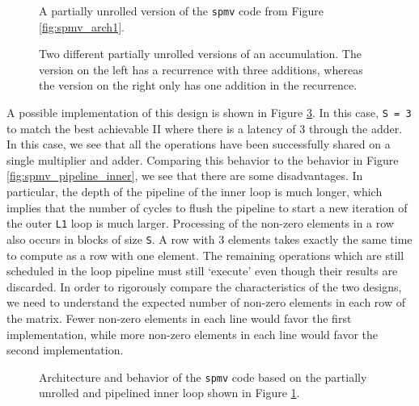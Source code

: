 \begin{figure}

\caption{A partially unrolled version of the \lstinline|spmv| code from Figure \ref{fig:spmv_arch1}.}
\label{fig:spmv_unrolled}
\end{figure}

\begin{figure}
\centering

\caption{Two different partially unrolled versions of an accumulation.  The version on the left has a recurrence with three additions, whereas the version on the right only has one addition in the recurrence.}
\label{fig:spmv_partial_unroll}
\end{figure}

A possible implementation of this design is shown in Figure \ref{fig:spmv_unrolled_behavior}.  In this case, \lstinline|S = 3| to match the best achievable II where there is a latency of 3 through the adder.  In this case, we see that all the operations have been successfully shared on a single multiplier and adder.  Comparing this behavior to the behavior in Figure \ref{fig:spmv_pipeline_inner}, we see that there are some disadvantages.  In particular, the depth of the pipeline of the inner loop is much longer, which implies that the number of cycles to flush the pipeline to start a new iteration of the outer \lstinline|L1| loop is much larger.  Processing of the non-zero elements in a row also occurs in blocks of size \lstinline|S|.  A row with 3 elements takes exactly the same time to compute as a row with one element.  The remaining operations which are still scheduled in the loop pipeline must still `execute' even though their results are discarded.  In order to rigorously compare the characteristics of the two designs, we need to understand the expected number of non-zero elements in each row of the matrix.  Fewer non-zero elements in each line would favor the first implementation, while more non-zero elements in each line would favor the second implementation.

\begin{figure}
\centering

\caption{Architecture and behavior of the \lstinline{spmv} code based on the partially unrolled and pipelined inner loop shown in Figure \ref{fig:spmv_unrolled}.}
\label{fig:spmv_unrolled_behavior}
\end{figure}

